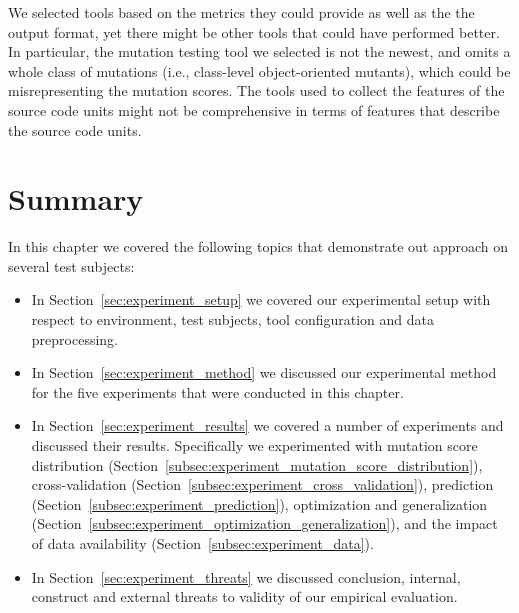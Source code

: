 We selected tools based on the metrics they could provide as well as the the output format, yet there might be other tools that could have performed better. In particular, the mutation testing tool we selected is not the newest, and omits a whole class of mutations (i.e., class-level object-oriented mutants), which could be misrepresenting the mutation scores. The tools used to collect the features of the source code units might not be comprehensive in terms of features that describe the source code units.


\section{Summary}
\label{sec:experiment_summary}
In this chapter we covered the following topics that demonstrate out approach on several test subjects:

\begin{itemize}
  \item In Section~\ref{sec:experiment_setup} we covered our experimental setup with respect to environment, test subjects, tool configuration and data preprocessing.
  \item In Section~\ref{sec:experiment_method} we discussed our experimental method for the five experiments that were conducted in this chapter.
  \item In Section~\ref{sec:experiment_results} we covered a number of experiments and discussed their results. Specifically we experimented with mutation score distribution (Section~\ref{subsec:experiment_mutation_score_distribution}), cross-validation (Section~\ref{subsec:experiment_cross_validation}), prediction (Section~\ref{subsec:experiment_prediction}), optimization and generalization (Section~\ref{subsec:experiment_optimization_generalization}), and the impact of data availability (Section~\ref{subsec:experiment_data}).
  \item In Section~\ref{sec:experiment_threats} we discussed conclusion, internal, construct and external threats to validity of our empirical evaluation.
\end{itemize}
